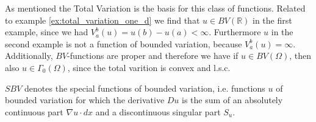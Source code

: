     As mentioned the Total Variation is the basis for this class of functions. Related to example \ref{ex:total_variation_one_d} we find that $u \in BV(\mathbb{R})$ in the first example, since we had $V^{b}_{a}(u) = u(b) - u(a) < \infty$. Furthermore $u$ in the second example is not a function of bounded variation, because $V^{b}_{a}(u) = \infty$.\\
    Additionally, $BV$-functions are proper and therefore we have if $u \in BV(\Omega)$, then also $u \in \Gamma_{0}(\Omega)$, since the total varition is convex and l.s.c.

    \begin{definition}
        $SBV$ denotes the special functions of bounded variation, i.e. functions $u$ of bounded variation for which the derivative $Du$ is the sum of an absolutely continuous part $\nabla u \cdot dx$ and a discontinuous singular part $S_{u}$.
    \end{definition}


